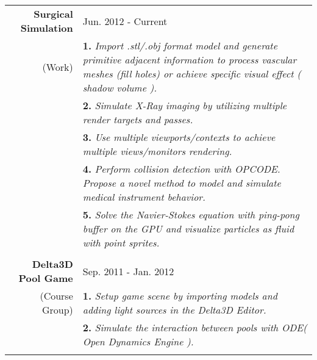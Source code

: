 \documentclass[a4paper,10pt]{article} %
\begin{document}
\begin{tabular}{r|p{12.0cm}}
\textbf{Surgical Simulation} &  Jun. 2012 - Current\\
\footnotesize{(Work)}& \footnotesize{\textbf{1.} \emph{Import .stl/.obj format model and generate primitive adjacent information to process vascular meshes (fill holes) or achieve specific visual effect ( shadow volume ).}} \\
 & \footnotesize{\textbf{2.} \emph{Simulate X-Ray imaging by utilizing multiple render targets and passes. }}\\
 & \footnotesize{\textbf{3.} \emph{Use multiple viewports/contexts to achieve multiple views/monitors rendering.}} \\
 & \footnotesize{\textbf{4.} \emph{Perform collision detection with OPCODE. Propose a novel method to model and simulate medical instrument behavior.}}\\
 & \footnotesize{\textbf{5.} \emph{Solve the Navier-Stokes equation with ping-pong buffer on the GPU and visualize particles as fluid with point sprites.}}\\
\multicolumn{2}{c}{} \\




\textbf{Delta3D Pool Game} & Sep. 2011 - Jan. 2012 \\
\footnotesize{(Course Group)} & \footnotesize{\textbf{1.} \emph{Setup game scene by importing models and adding light sources in the Delta3D Editor.}} \\
& \footnotesize{\textbf{2.} \emph{Simulate the interaction between pools with ODE( Open Dynamics Engine ).}} \\
\multicolumn{2}{c}{} \\




\end{tabular}
\end{document}
